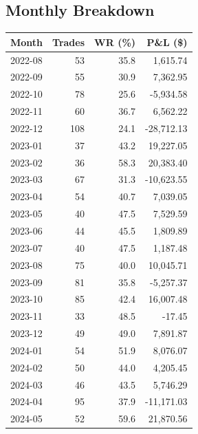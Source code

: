 \documentclass[11pt,a4paper,twoside]{article}
\begin{document}
\subsection{Monthly Breakdown}
\noindent\begin{center}
\begin{tabular}{>{\color{txtmain}}l rrr}
\toprule
\rowcolor{cardbg}
\textbf{Month} & \textbf{Trades} & \textbf{WR (\%)} & \textbf{P\&L (\$)} \\
\midrule
2022-08 & 53 & 35.8 & \textcolor{wingreen}{1,615.74} \\
2022-09 & 55 & 30.9 & \textcolor{wingreen}{7,362.95} \\
2022-10 & 78 & 25.6 & \textcolor{lossred}{-5,934.58} \\
2022-11 & 60 & 36.7 & \textcolor{wingreen}{6,562.22} \\
2022-12 & 108 & 24.1 & \textcolor{lossred}{-28,712.13} \\
2023-01 & 37 & 43.2 & \textcolor{wingreen}{19,227.05} \\
2023-02 & 36 & 58.3 & \textcolor{wingreen}{20,383.40} \\
2023-03 & 67 & 31.3 & \textcolor{lossred}{-10,623.55} \\
2023-04 & 54 & 40.7 & \textcolor{wingreen}{7,039.05} \\
2023-05 & 40 & 47.5 & \textcolor{wingreen}{7,529.59} \\
2023-06 & 44 & 45.5 & \textcolor{wingreen}{1,809.89} \\
2023-07 & 40 & 47.5 & \textcolor{wingreen}{1,187.48} \\
2023-08 & 75 & 40.0 & \textcolor{wingreen}{10,045.71} \\
2023-09 & 81 & 35.8 & \textcolor{lossred}{-5,257.37} \\
2023-10 & 85 & 42.4 & \textcolor{wingreen}{16,007.48} \\
2023-11 & 33 & 48.5 & \textcolor{lossred}{-17.45} \\
2023-12 & 49 & 49.0 & \textcolor{wingreen}{7,891.87} \\
2024-01 & 54 & 51.9 & \textcolor{wingreen}{8,076.07} \\
2024-02 & 50 & 44.0 & \textcolor{wingreen}{4,205.45} \\
2024-03 & 46 & 43.5 & \textcolor{wingreen}{5,746.29} \\
2024-04 & 95 & 37.9 & \textcolor{lossred}{-11,171.03} \\
2024-05 & 52 & 59.6 & \textcolor{wingreen}{21,870.56} \\

\end{tabular}
\end{center}
\end{document}
